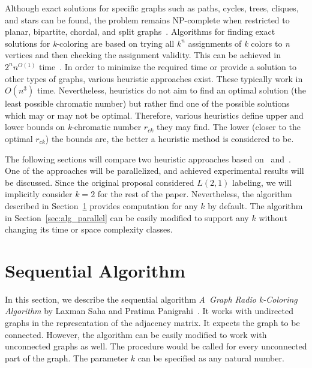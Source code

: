 \documentclass[11pt,a4paper]{article}
\begin{document}
Although exact solutions for specific graphs such as paths, cycles, trees, cliques, and stars can be found, the problem remains NP-complete when restricted to planar, bipartite, chordal, and split graphs~\cite{yeh2006_dist2label_survey}\cite{deo2003_parallel_radiocoloring}.  Algorithms for finding exact solutions for \emph{k}-coloring are based on trying all $k^n$ assignments of \emph{k} colors to \emph{n} vertices and then checking the assignment validity. This can be achieved in $2^n n^{O(1)}$ time~\cite{bjorklund2009_setpart}. In order to minimize the required time or provide a solution to other types of graphs, various heuristic approaches exist. These typically work in $O(n^3)$ time. Nevertheless, heuristics do not aim to find an optimal solution (the least possible chromatic number) but rather find one of the possible solutions which may or may not be optimal. Therefore, various heuristics define upper and lower bounds on \emph{k}-chromatic number $r_{ck}$ they may find. The lower (closer to the optimal $r_{ck}$) the bounds are, the better a heuristic method is considered to be.

The following sections will compare two heuristic approaches based on~\cite{laxman2012_radio_k-coloring} and~\cite{deo2003_parallel_radiocoloring}. One of the approaches will be parallelized, and achieved experimental results will be discussed. Since the original proposal considered $L(2,1)$ labeling, we will implicitly consider $k=2$ for the rest of the paper. Nevertheless, the algorithm described in Section~\ref{sec:alg_sequential} provides computation for any $k$ by default. The algorithm in Section~\ref{sec:alg_parallel} can be easily modified to support any $k$ without changing its time or space complexity classes.


\section{Sequential Algorithm}
\label{sec:alg_sequential}

In this section, we describe the sequential algorithm \textit{A~Graph Radio k-Coloring Algorithm} by Laxman Saha and Pratima Panigrahi~\cite{laxman2012_radio_k-coloring}. It works with undirected graphs in the representation of the adjacency matrix. It expects the graph to be connected. However, the algorithm can be easily modified to work with unconnected graphs as well. The procedure would be called for every unconnected part of the graph. The parameter $k$ can be specified as any natural number.
\end{document}
